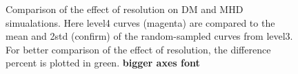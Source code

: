 \begin{figure}[!ht]
  \centering
  \hfill
  \caption{Comparison of the effect of resolution on DM and MHD simualations. Here level4 curves (magenta) are compared to the mean and 2std (confirm) of the random-sampled curves from level3. For better comparison of the effect of resolution, the difference percent is plotted in green.  \textbf{bigger axes font}}
\end{figure}

